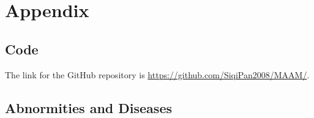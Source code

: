 \documentclass{article}
\begin{document}
	\newrefcontext[sorting=nyt]
	\printbibliography
	
	\pagebreak
	\section*{Appendix}
	
	\subsection*{Code}
	
	The link for the GitHub repository is \url{https://github.com/SiqiPan2008/MAAM/}.
	
	\subsection*{Abnormities and Diseases}
	
\end{document}
